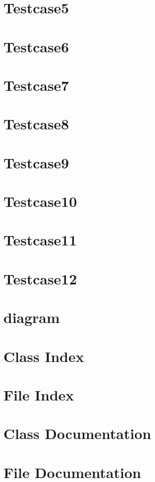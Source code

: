 \documentclass[twoside]{article}
\newcommand{\+}{\discretionary{\mbox{\scriptsize$\hookleftarrow$}}{}{}}
\begin{document}
\section{Testcase5}
\label{Testcase5}
\hypertarget{Testcase5}{}

\section{Testcase6}
\label{Testcase6}
\hypertarget{Testcase6}{}

\section{Testcase7}
\label{Testcase7}
\hypertarget{Testcase7}{}

\section{Testcase8}
\label{Testcase8}
\hypertarget{Testcase8}{}

\section{Testcase9}
\label{Testcase9}
\hypertarget{Testcase9}{}

\section{Testcase10}
\label{Testcase10}
\hypertarget{Testcase10}{}

\section{Testcase11}
\label{Testcase11}
\hypertarget{Testcase11}{}

\section{Testcase12}
\label{Testcase12}
\hypertarget{Testcase12}{}

\section{diagram}
\label{diagram}
\hypertarget{diagram}{}

\section{Class Index}

\section{File Index}

\section{Class Documentation}




\section{File Documentation}








\newpage
{}
{}
\printindex
\end{document}
